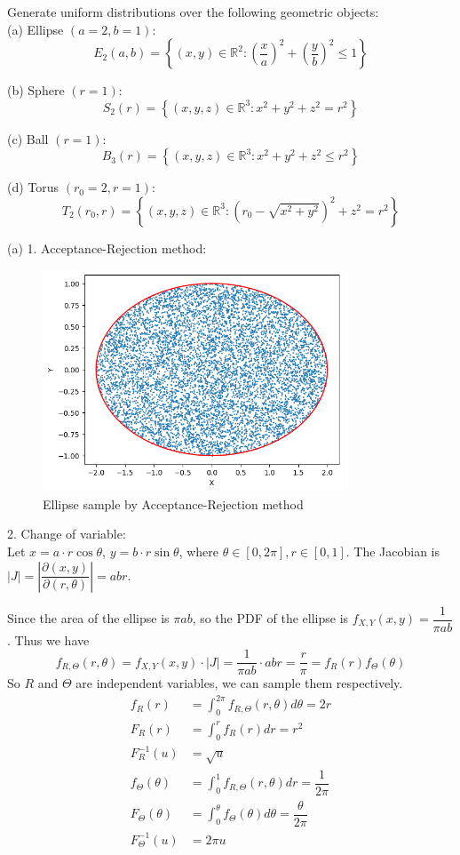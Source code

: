 \begin{homeworkProblem}

Generate uniform distributions over the following geometric objects: \\
(a) Ellipse $(a=2, b=1)$:
$$E_2(a, b)=\left\{(x, y) \in \mathbb{R}^2:\left(\frac{x}{a}\right)^2+\left(\frac{y}{b}\right)^2 \leq 1\right\}$$

(b) Sphere $(r=1)$:
$$S_2(r)=\left\{(x, y, z) \in \mathbb{R}^3: x^2+y^2+z^2=r^2\right\}$$

(c) Ball $(r=1)$:
$$B_3(r)=\left\{(x, y, z) \in \mathbb{R}^3: x^2+y^2+z^2 \leq r^2\right\}$$

(d) Torus $\left(r_0=2, r=1\right)$:
$$T_2\left(r_0, r\right)=\left\{(x, y, z) \in \mathbb{R}^3:\left(r_0-\sqrt{x^2+y^2}\right)^2+z^2=r^2\right\}$$

\solution

(a) 1. Acceptance-Rejection method: \\
\begin{figure}[h]
    \centering
    \includegraphics[width=0.8\textwidth]{./figure/p7/a_accept_reject.png}
    \caption{Ellipse sample by Acceptance-Rejection method}
\end{figure}

2. Change of variable: \\
Let $x=a\cdot r\cos\theta$, $y=b\cdot r\sin\theta$, where $\theta\in [0, 2\pi], r\in [0, 1]$. The Jacobian is $|J|=\left|\dfrac{\partial(x, y)}{\partial(r, \theta)}\right|=abr$.

Since the area of the ellipse is $\pi ab$, so the PDF of the ellipse is $f_{X, Y}(x, y)=\dfrac{1}{\pi ab}$. Thus we have
$$f_{R, \Theta}(r, \theta)=f_{X, Y}(x, y)\cdot|J|=\dfrac{1}{\pi ab}\cdot abr=\dfrac{r}{\pi}=f_R(r)f_{\Theta}(\theta)$$
So $R$ and $\Theta$ are independent variables, we can sample them respectively.
\begin{align*}
f_R(r) &= \int_{0}^{2\pi}f_{R, \Theta}(r, \theta)d\theta = 2r \\
F_R(r) &= \int_{0}^{r}f_R(r)dr = r^2 \\
F^{-1}_R(u) &= \sqrt{u} \\
f_{\Theta}(\theta) &= \int_{0}^{1}f_{R, \Theta}(r, \theta)dr = \dfrac{1}{2\pi} \\
F_{\Theta}(\theta) &= \int_{0}^{\theta}f_{\Theta}(\theta)d\theta = \dfrac{\theta}{2\pi} \\
F^{-1}_{\Theta}(u) &= 2\pi u
\end{align*}


\end{homeworkProblem}
